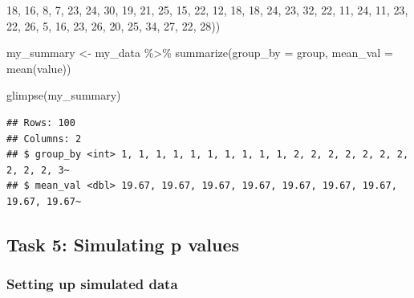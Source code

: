 \documentclass[
  openany]{book}
\newenvironment{Shaded}{\begin{snugshade}}{\end{snugshade}}
\newcommand{\AttributeTok}[1]{\textcolor[rgb]{0.77,0.63,0.00}{#1}}
\newcommand{\DecValTok}[1]{\textcolor[rgb]{0.00,0.00,0.81}{#1}}
\newcommand{\FunctionTok}[1]{\textcolor[rgb]{0.00,0.00,0.00}{#1}}
\newcommand{\NormalTok}[1]{#1}
\newcommand{\OtherTok}[1]{\textcolor[rgb]{0.56,0.35,0.01}{#1}}
\newcommand{\SpecialCharTok}[1]{\textcolor[rgb]{0.00,0.00,0.00}{#1}}
\begin{document}
\begin{Shaded}
\begin{Highlighting}[]
                            \DecValTok{18}\NormalTok{, }\DecValTok{16}\NormalTok{, }\DecValTok{8}\NormalTok{, }\DecValTok{7}\NormalTok{, }\DecValTok{23}\NormalTok{, }\DecValTok{24}\NormalTok{, }\DecValTok{30}\NormalTok{, }\DecValTok{19}\NormalTok{, }\DecValTok{21}\NormalTok{, }\DecValTok{25}\NormalTok{, }\DecValTok{15}\NormalTok{, }\DecValTok{22}\NormalTok{, }\DecValTok{12}\NormalTok{, }
                            \DecValTok{18}\NormalTok{, }\DecValTok{18}\NormalTok{, }\DecValTok{24}\NormalTok{, }\DecValTok{23}\NormalTok{, }\DecValTok{32}\NormalTok{, }\DecValTok{22}\NormalTok{, }\DecValTok{11}\NormalTok{, }\DecValTok{24}\NormalTok{, }\DecValTok{11}\NormalTok{, }\DecValTok{23}\NormalTok{, }\DecValTok{22}\NormalTok{, }\DecValTok{26}\NormalTok{, }\DecValTok{5}\NormalTok{, }
                            \DecValTok{16}\NormalTok{, }\DecValTok{23}\NormalTok{, }\DecValTok{26}\NormalTok{, }\DecValTok{20}\NormalTok{, }\DecValTok{25}\NormalTok{, }\DecValTok{34}\NormalTok{, }\DecValTok{27}\NormalTok{, }\DecValTok{22}\NormalTok{, }\DecValTok{28}\NormalTok{))}

\NormalTok{my\_summary }\OtherTok{\textless{}{-}}\NormalTok{ my\_data }\SpecialCharTok{\%\textgreater{}\%} 
  \FunctionTok{summarize}\NormalTok{(}\AttributeTok{group\_by =}\NormalTok{ group, }\AttributeTok{mean\_val =} \FunctionTok{mean}\NormalTok{(value))}

\FunctionTok{glimpse}\NormalTok{(my\_summary)}
\end{Highlighting}
\end{Shaded}

\begin{verbatim}
## Rows: 100
## Columns: 2
## $ group_by <int> 1, 1, 1, 1, 1, 1, 1, 1, 1, 1, 2, 2, 2, 2, 2, 2, 2, 2, 2, 2, 3~
## $ mean_val <dbl> 19.67, 19.67, 19.67, 19.67, 19.67, 19.67, 19.67, 19.67, 19.67~
\end{verbatim}

\newpage

\hypertarget{task-5-simulating-p-values}{%
\subsection{Task 5: Simulating p values}\label{task-5-simulating-p-values}}

\hypertarget{setting-up-simulated-data}{%
\subsubsection{Setting up simulated data}\label{setting-up-simulated-data}}
\end{document}
